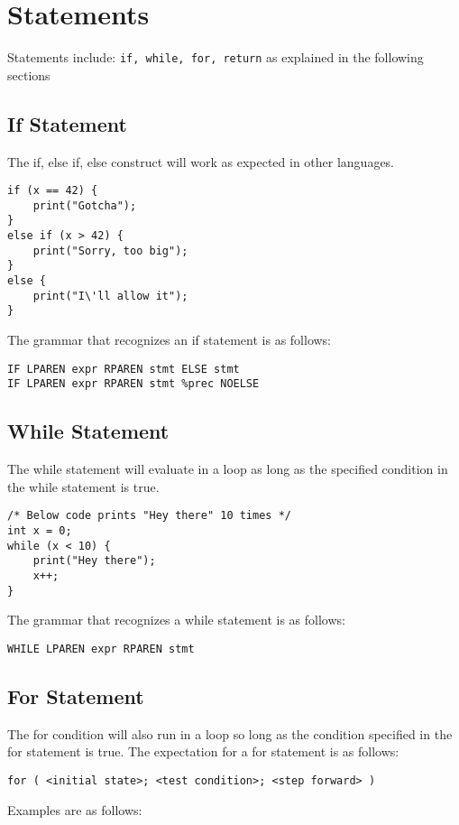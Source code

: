 \documentclass{article}
\begin{document}
\section{Statements}
Statements include: \texttt{if, while, for, return} as explained in the following sections

\subsection{If Statement}
The if, else if, else construct will work as expected in other languages.

\begin{lstlisting}
if (x == 42) {
	print("Gotcha");
}
else if (x > 42) {
	print("Sorry, too big");
}
else {
	print("I\'ll allow it");
}
\end{lstlisting}

The grammar that recognizes an if statement is as follows:
\begin{Verbatim}[frame=single]
IF LPAREN expr RPAREN stmt ELSE stmt
IF LPAREN expr RPAREN stmt %prec NOELSE
\end{Verbatim}

\subsection{While Statement}
The while statement will evaluate in a loop as long as the specified condition in the while statement is true.

\begin{lstlisting}
/* Below code prints "Hey there" 10 times */
int x = 0;
while (x < 10) {
	print("Hey there");
	x++;
}
\end{lstlisting}

The grammar that recognizes a while statement is as follows:
\begin{Verbatim}[frame=single]
WHILE LPAREN expr RPAREN stmt
\end{Verbatim}

\subsection{For Statement}
The for condition will also run in a loop so long as the condition specified in the for statement is true.  The expectation for a for statement is as follows:

\texttt{for ( <initial state>; <test condition>; <step forward> )}

Examples are as follows:
\end{document}
